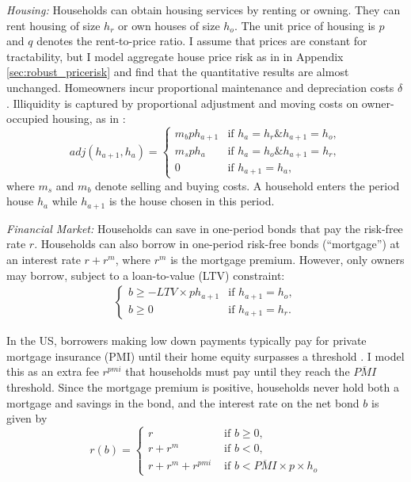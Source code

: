 \documentclass[12pt]{article}
\begin{document}
\textit{Housing:}  Households can obtain housing services by renting or owning. They can rent housing of size $h_r$ or own houses of size $h_o$. The unit price of housing is $p$ and $q$ denotes the rent-to-price ratio. I assume that prices are constant for tractability, but I model aggregate house price risk as in \cite{Corbae2015} in Appendix \ref{sec:robust_pricerisk} and find that the quantitative results are almost unchanged. Homeowners incur proportional maintenance and depreciation costs $\delta$. Illiquidity is captured by proportional adjustment and moving costs on owner-occupied housing, as in \cite{Yang2009}:
\begin{equation}\label{eq:transcost}
adj(h_{a+1},h_a) = \begin{cases}
m_b p h_{a+1} & \text{if } h_{a}=h_r\mathbin{\&} h_{a+1}= h_o, \\
m_s p h_a 	& \text{if } h_a = h_o\mathbin{\&}h_{a+1}=h_r, \\
0 & \text{if } h_{a+1} = h_a,
\end{cases}
\end{equation} where $m_s$ and $m_b$ denote selling and buying costs. A household enters the period house $h_a$ while $h_{a+1}$ is the house chosen in this period. 



\textit{Financial Market:} Households can save in one-period bonds that pay the risk-free rate $r$. Households can also borrow in one-period risk-free bonds (``mortgage'')  at an interest rate $r + r^m$, where $r^m$ is the mortgage premium. However, only owners may borrow, subject to a loan-to-value (LTV) constraint:
\begin{align*}
\begin{cases}
b\ge - LTV \times p h_{a+1} & \text{if } h_{a+1} = h_o, \\ 
b\ge 0  & \text{if } h_{a+1} = h_r.
\end{cases}
\end{align*}

In the US, borrowers making low down payments typically pay for private mortgage insurance (PMI)  until their home equity surpasses a threshold \citep{goodman2017sixty}. I model this as an extra fee $r^{pmi}$ that households must pay until they reach the $\overline{PMI}$ threshold. Since the mortgage premium is positive, households never hold both a mortgage and savings in the bond, and the interest rate on the net bond $b$ is given by
\begin{equation}\label{eq:rb}
r(b) = \begin{cases}
r & \text{ if } b\ge0, \\
r +r^m & \text{ if } b<0, \\
r +r^m +r^{pmi}& \text{ if } b < \overline{PMI}\times p\times h_o
\end{cases}
\end{equation}
\end{document}
